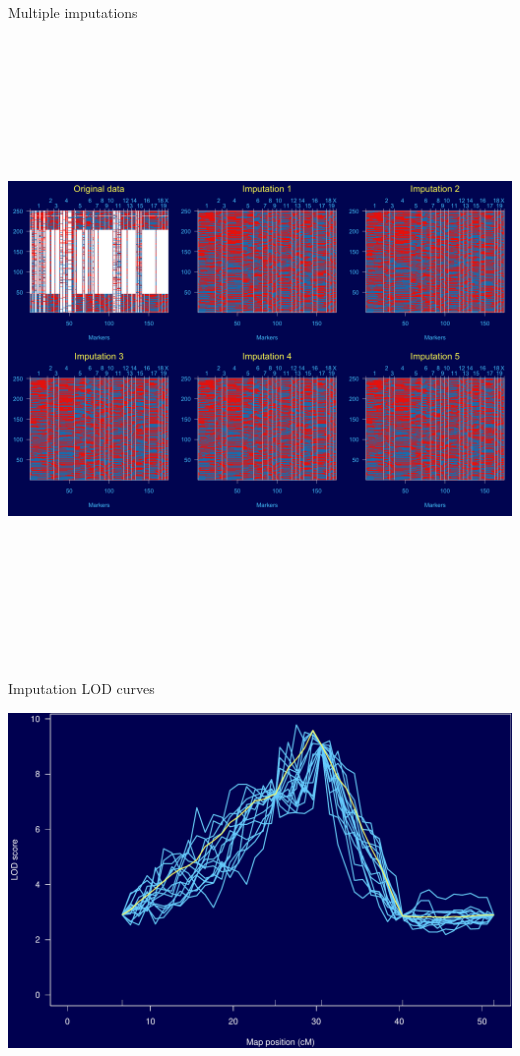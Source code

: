 \documentclass[12pt]{article}
\newcommand{\headsize}{\fontsize{35}{35} \selectfont}
\begin{document}
\headsize \color{myyellow}
\hfill \begin{minipage}{5.75in}
\centering
Multiple imputations
\end{minipage}

\vfill

\centerline{\includegraphics[height=6.5in]{FigsA/multiimp.png}}



\newpage

\headsize \color{myyellow}
\hfill \begin{minipage}{5.75in}
\centering
Imputation LOD curves
\end{minipage}

\vfill

\centerline{\includegraphics{FigsA/imp_lod.pdf}}
\end{document}
